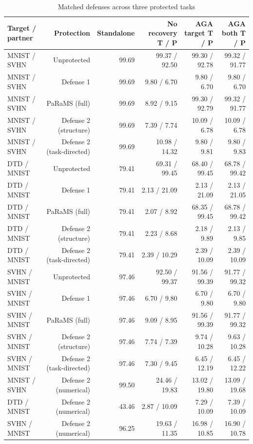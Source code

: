 \begin{table}[!htbp]
\centering
\small
\caption{Matched defenses across three protected tasks}
\label{tab:three_tasks}
\begin{tabular}{lrrrrr}
\toprule
Target / partner & Protection & Standalone & No recovery T / P & AGA target T / P & AGA both T / P \\
\midrule
MNIST / SVHN & Unprotected & 99.69 & 99.37 / 92.50 & 99.30 / 92.78 & 99.32 / 91.77 \\
MNIST / SVHN & Defense 1 & 99.69 & 9.80 / 6.70 & 9.80 / 6.70 & 9.80 / 6.70 \\
MNIST / SVHN & PaRaMS (full) & 99.69 & 8.92 / 9.15 & 99.30 / 92.79 & 99.32 / 91.77 \\
MNIST / SVHN & Defense 2 (structure) & 99.69 & 7.39 / 7.74 & 10.09 / 6.78 & 10.09 / 6.78 \\
MNIST / SVHN & Defense 2 (task-directed) & 99.69 & 10.98 / 14.32 & 9.80 / 9.81 & 9.80 / 9.83 \\
DTD / MNIST & Unprotected & 79.41 & 69.31 / 99.45 & 68.40 / 99.45 & 68.78 / 99.42 \\
DTD / MNIST & Defense 1 & 79.41 & 2.13 / 21.09 & 2.13 / 21.09 & 2.13 / 21.05 \\
DTD / MNIST & PaRaMS (full) & 79.41 & 2.07 / 8.92 & 68.35 / 99.45 & 68.78 / 99.42 \\
DTD / MNIST & Defense 2 (structure) & 79.41 & 2.23 / 8.68 & 2.18 / 9.89 & 2.13 / 9.85 \\
DTD / MNIST & Defense 2 (task-directed) & 79.41 & 2.39 / 10.29 & 2.39 / 10.09 & 2.39 / 10.09 \\
SVHN / MNIST & Unprotected & 97.46 & 92.50 / 99.37 & 91.56 / 99.39 & 91.77 / 99.32 \\
SVHN / MNIST & Defense 1 & 97.46 & 6.70 / 9.80 & 6.70 / 9.80 & 6.70 / 9.80 \\
SVHN / MNIST & PaRaMS (full) & 97.46 & 9.09 / 8.95 & 91.56 / 99.39 & 91.77 / 99.32 \\
SVHN / MNIST & Defense 2 (structure) & 97.46 & 7.74 / 7.39 & 9.74 / 10.28 & 9.63 / 10.28 \\
SVHN / MNIST & Defense 2 (task-directed) & 97.46 & 7.30 / 9.45 & 6.45 / 12.19 & 6.45 / 12.22 \\
MNIST / SVHN & Defense 2 (numerical) & 99.50 & 24.46 / 19.83 & 13.02 / 19.80 & 13.09 / 19.68 \\
DTD / MNIST & Defense 2 (numerical) & 43.46 & 2.87 / 10.09 & 7.29 / 10.09 & 7.39 / 10.09 \\
SVHN / MNIST & Defense 2 (numerical) & 96.25 & 19.63 / 11.35 & 16.98 / 10.85 & 16.90 / 10.78 \\

\end{tabular}
\end{table}
